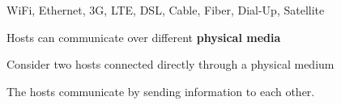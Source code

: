 \begin{frame}\begin{center}
\large
WiFi, Ethernet, 3G, LTE, DSL, Cable, Fiber, Dial-Up, Satellite
\end{center}\end{frame}

\begin{frame}
\begin{center}
\large
Hosts can communicate over different \textbf{physical media}
\end{center}
\end{frame}

\begin{frame}[plain]\begin{center}
\end{center}\end{frame}

\begin{frame}[t]\normalsize
	Consider two hosts connected directly through a physical medium
\end{frame}

\begin{frame}[t]\normalsize
	The hosts communicate by sending information to each other.
\end{frame}

